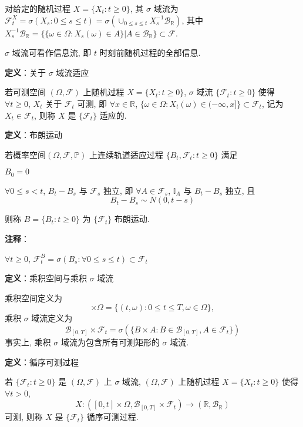 \documentclass[openany]{ctexbook}
\theoremstyle{kaiti}
\theoremstyle{normal}
\begin{document}
对给定的随机过程 $X=\{X_t:t\geqslant0\}$, 其 $\sigma$ 域流为 $\mathcal{F}_t^X=\sigma(X_s:0\leqslant s\leqslant t)=\sigma(\cup_{0\leqslant s\leqslant t}X_s^{-1}\mathcal{B}_{\mathbb{R}})$, 其中 $X_s^{-1}\mathcal{B}_{\mathbb{R}}=\{\{\omega\in\Omega:X_s(\omega)\in A\}|A\in\mathcal{B}_{\mathbb{R}}\}\subset\mathcal{F}$.

$\sigma$ 域流可看作信息流, 即 $t$ 时刻前随机过程的全部信息.

\textbf{定义}：关于 $\sigma$ 域流适应

若可测空间 $(\Omega,\mathcal{F})$ 上随机过程 $X=\{X_t:t\geqslant0\}$, $\sigma$ 域流 $\{\mathcal{F}_t:t\geqslant0\}$ 使得 $\forall t\geqslant0$, $X_t$ 关于 $\mathcal{F}_t$ 可测, 即 $\forall x\in\mathbb{R}$, $\{\omega\in\Omega:X_t(\omega)\in(-\infty,x]\}\subset\mathcal{F}_t$, 记为 $X_t\in\mathcal{F}_t$, 则称 $X$ 是 $\{\mathcal{F}_t\}$ 适应的.

\textbf{定义}：布朗运动

若概率空间$(\Omega,\mathcal{F},\mathbb{P})$ 上连续轨道适应过程 $\{B_t,\mathcal{F}_t:t\geqslant0\}$ 满足

$B_0=0$

$\forall0\leqslant s<t$, $B_t-B_s$ 与 $\mathcal{F}_s$ 独立, 即 $\forall A\in\mathcal{F}_s$, $\mathbb{I}_A$ 与 $B_t-B_s$ 独立, 且
\begin{equation}
  B_t-B_s\sim N(0,t-s)
\end{equation}

则称 $B=\{B_t:t\geqslant0\}$ 为 $\{\mathcal{F}_t\}$ 布朗运动. 

\textbf{注释}：

$\forall t\geqslant0$, $\mathcal{F}_t^B=\sigma(B_s:\forall0\leqslant s\leqslant t)\subset\mathcal{F}_t$

\textbf{定义}：乘积空间与乘积 $\sigma$ 域流

乘积空间定义为
\begin{equation}
  [0,T]\times\Omega=\{(t,\omega):0\leqslant t\leqslant T,\omega\in\Omega\},
\end{equation}
乘积 $\sigma$ 域流定义为
\begin{equation}
  \mathcal{B}_{[0,T]}\times\mathcal{F}_t=\sigma(\{B\times A:B\in\mathcal{B}_{[0,T]},A\in\mathcal{F}_t\})
\end{equation}
事实上, 乘积 $\sigma$ 域流为包含所有可测矩形的 $\sigma$ 域流.

\textbf{定义}：循序可测过程

若 $\{\mathcal{F}_t:t\geqslant0\}$ 是 $(\Omega,\mathcal{F})$ 上 $\sigma$ 域流, $(\Omega,\mathcal{F})$ 上随机过程 $X=\{X_t:t\geqslant0\}$ 使得 $\forall t>0$,
\begin{equation}
  X:([0,t]\times\Omega,\mathcal{B}_{[0,T]}\times\mathcal{F}_t)\to(\mathbb{R},\mathcal{B}_{\mathbb{R}})
\end{equation}
可测, 则称 $X$ 是 $\{\mathcal{F}_t\}$ 循序可测过程.
\end{document}
